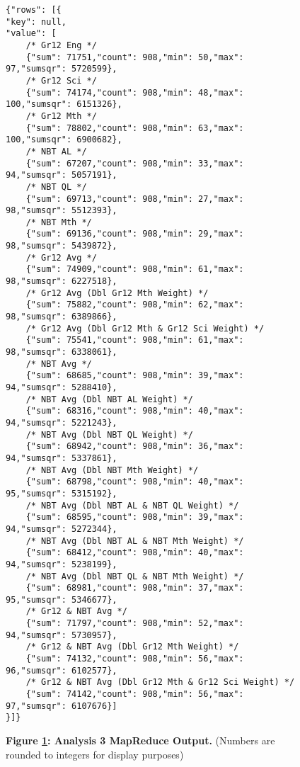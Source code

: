 \begin{figure}[H]
    \centering
    \begin{mdframed}
        \centering
        \begin{verbatim}
{"rows": [{
"key": null,    
"value": [
    /* Gr12 Eng */
    {"sum": 71751,"count": 908,"min": 50,"max": 97,"sumsqr": 5720599},
    /* Gr12 Sci */
    {"sum": 74174,"count": 908,"min": 48,"max": 100,"sumsqr": 6151326},
    /* Gr12 Mth */
    {"sum": 78802,"count": 908,"min": 63,"max": 100,"sumsqr": 6900682},
    /* NBT AL */
    {"sum": 67207,"count": 908,"min": 33,"max": 94,"sumsqr": 5057191},
    /* NBT QL */
    {"sum": 69713,"count": 908,"min": 27,"max": 98,"sumsqr": 5512393},
    /* NBT Mth */
    {"sum": 69136,"count": 908,"min": 29,"max": 98,"sumsqr": 5439872},
    /* Gr12 Avg */
    {"sum": 74909,"count": 908,"min": 61,"max": 98,"sumsqr": 6227518},
    /* Gr12 Avg (Dbl Gr12 Mth Weight) */
    {"sum": 75882,"count": 908,"min": 62,"max": 98,"sumsqr": 6389866},
    /* Gr12 Avg (Dbl Gr12 Mth & Gr12 Sci Weight) */
    {"sum": 75541,"count": 908,"min": 61,"max": 98,"sumsqr": 6338061},
    /* NBT Avg */
    {"sum": 68685,"count": 908,"min": 39,"max": 94,"sumsqr": 5288410},
    /* NBT Avg (Dbl NBT AL Weight) */
    {"sum": 68316,"count": 908,"min": 40,"max": 94,"sumsqr": 5221243},
    /* NBT Avg (Dbl NBT QL Weight) */
    {"sum": 68942,"count": 908,"min": 36,"max": 94,"sumsqr": 5337861},
    /* NBT Avg (Dbl NBT Mth Weight) */
    {"sum": 68798,"count": 908,"min": 40,"max": 95,"sumsqr": 5315192},
    /* NBT Avg (Dbl NBT AL & NBT QL Weight) */
    {"sum": 68595,"count": 908,"min": 39,"max": 94,"sumsqr": 5272344},
    /* NBT Avg (Dbl NBT AL & NBT Mth Weight) */
    {"sum": 68412,"count": 908,"min": 40,"max": 94,"sumsqr": 5238199},
    /* NBT Avg (Dbl NBT QL & NBT Mth Weight) */
    {"sum": 68981,"count": 908,"min": 37,"max": 95,"sumsqr": 5346677},
    /* Gr12 & NBT Avg */
    {"sum": 71797,"count": 908,"min": 52,"max": 94,"sumsqr": 5730957},
    /* Gr12 & NBT Avg (Dbl Gr12 Mth Weight) */
    {"sum": 74132,"count": 908,"min": 56,"max": 96,"sumsqr": 6102577},
    /* Gr12 & NBT Avg (Dbl Gr12 Mth & Gr12 Sci Weight) */
    {"sum": 74142,"count": 908,"min": 56,"max": 97,"sumsqr": 6107676}]
}]}      
        \end{verbatim}
    \end{mdframed}
    \caption[Analysis 3 MapReduce Output]{\textbf{Figure \ref{fig-variance-reduce-output}: Analysis 3 MapReduce Output.} (Numbers are rounded to integers for display purposes)}
    \label{fig-variance-reduce-output}
\end{figure}
